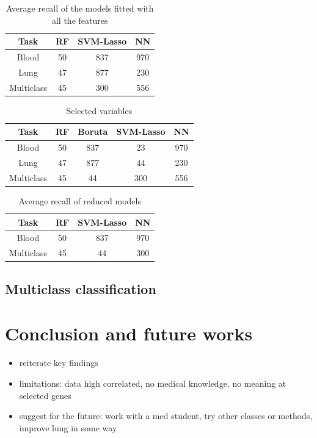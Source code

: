 \documentclass[a4paper,11pt, oneside]{article}  %
\begin{document}
\begin{table}[ht]
\caption{Average recall of the models fitted with all the features}
\centering
\begin{tabular}{c c c c}
\hline\hline
Task & RF & SVM-Lasso & NN \\ [0.5ex] %
\hline
Blood & 50 & 837 & 970 \\
Lung &47 & 877 & 230 \\
Multiclass & 45 & 300 & 556 \\ [1ex]
\hline
\end{tabular}
\label{table:big_models}
\end{table}

\begin{table}[ht]
\caption{Selected variables}
\centering
\begin{tabular}{c c c c c}
\hline\hline
Task & RF & Boruta & SVM-Lasso & NN \\ [0.5ex] %
\hline
Blood & 50 &837 & 23 & 970 \\
Lung &47 & 877 & 44 & 230 \\
Multiclass & 45 &  44 & 300 & 556 \\ [1ex]
\hline
\end{tabular}
\label{table:selected variables}
\end{table}

\begin{table}[ht]
\caption{Average recall of reduced models}
\centering
\begin{tabular}{c c c c}
\hline\hline
Task & RF & SVM-Lasso & NN \\ [0.5ex] %
\hline
Blood & 50 &837 & 970 \\
Multiclass & 45 &  44 & 300 \\ [1ex]
\hline
\end{tabular}
\label{table:reduced_models}
\end{table}





\subsection{Multiclass classification}


\section{Conclusion and future works}
\begin{itemize}
\item reiterate key findings
\item limitations: data high correlated,  no medical knowledge,  no meaning at selected genes
\item suggest for the future: work with a med student,  try other classes or methods,  improve lung in some way
\end{itemize}
\end{document}
